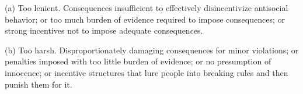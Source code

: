 \documentclass[12pt]{article}
\begin{document}
\begin{enumerate}
  (a) Too lenient. Consequences insufficient to effectively disincentivize antisocial behavior; or too much burden of evidence required to impose consequences; or strong incentives not to impose adequate consequences.

  (b) Too harsh. Disproportionately damaging consequences for minor violations; or penalties imposed with too little burden of evidence; or no presumption of innocence; or incentive structures that lure people into breaking rules and then punish them for it.
  
  
\end{enumerate}
\end{document}
